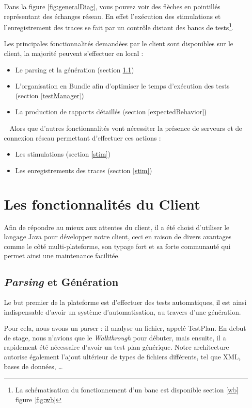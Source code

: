 Dans la figure \ref{fig:generalDiag}, vous pouvez voir des flèches en pointillés représentant des échanges réseau. En effet
l'exécution des stimulations et l'enregistrement des traces se fait par un contrôle distant des bancs de tests\footnote{La
	schématisation du fonctionnement d'un banc est disponible section \ref{wb} figure \ref{fig:wb}}.

Les principales fonctionnalités demandées par le client sont disponibles sur le client, la majorité peuvent s'effectuer en local : 
\begin{itemize}
	\item Le parsing et la génération (section \ref{generation})
	\item L'organisation en Bundle afin d'optimiser le temps d'exécution des tests (section \ref{testManager})
	\item La production de rapports détaillés (section \ref{expectedBehavior})
\end{itemize}~\newline
Alors que d'autres fonctionnalités vont nécessiter la présence de serveurs et de connexion réseau permettant d'effectuer ces actions
: 
\begin{itemize}
	\item Les stimulations (section \ref{stim})
	\item Les enregistrements des traces (section \ref{stim})
\end{itemize}
\vspace{-10px}
\section{Les fonctionnalités du Client}
Afin de répondre au mieux aux attentes du client, il a été choisi d'utiliser le langage Java pour développer notre client, ceci en raison de
divers avantages comme le côté multi-plateforme, son typage fort et sa forte communauté qui permet ainsi une maintenance facilitée. 

\subsection{\textit{Parsing} et Génération}\label{generation}
Le but premier de la plateforme est d'effectuer des tests automatiques, il est ainsi indispensable d'avoir un système d'automatisation, au travers d'une génération.

Pour cela, nous avons un parser : il analyse un fichier, appelé TestPlan. En debut de stage, nous n'avions que le \textit{Walkthrough} pour débuter, mais ensuite, il a rapidement été nécessaire d'avoir un test plan générique. Notre architecture autorise également l'ajout ultérieur de types de fichiers différents, tel que XML, bases de données, \ldots 

